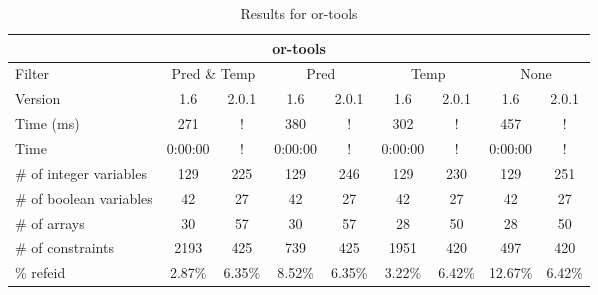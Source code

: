 \documentclass{standalone}
\begin{document}
\begin{table}[H]
\footnotesize
\centering
\begin{tabular}{lc|c|c|c|c|c|c|c}
\multicolumn{9}{c}{or-tools} \\ 
\hline\hline Filter & \multicolumn{2}{c|}{Pred \& Temp} &\multicolumn{2}{c|}{Pred}  & \multicolumn{2}{c|}{Temp} & \multicolumn{2}{c}{None} \\ 
\hline Version & 1.6 & 2.0.1 & 1.6 & 2.0.1 & 1.6 & 2.0.1 & 1.6 & 2.0.1 \\ 
Time (ms)               & 271 & ! & 380 & ! & 302 & ! & 457 & ! \\
Time                    & 0:00:00 & ! & 0:00:00 & ! & 0:00:00 & ! & 0:00:00 & ! \\ 
\# of integer variables & 129 & 225 & 129 & 246 & 129 & 230 & 129 & 251 \\ 
\# of boolean variables & 42 & 27 & 42 & 27 & 42 & 27 & 42 & 27 \\ 
\# of arrays            & 30 & 57 & 30 & 57 & 28 & 50 & 28 & 50 \\ 
\# of constraints       & 2193 & 425 & 739 & 425 & 1951 & 420 & 497 & 420 \\ 
\% refeid               & 2.87\% & 6.35\% & 8.52\% & 6.35\% & 3.22\% & 6.42\% & 12.67\% & 6.42\% \\ 
\end{tabular}
\caption{Results for or-tools}\label{tab:res_or}
\end{table}
\end{document}
